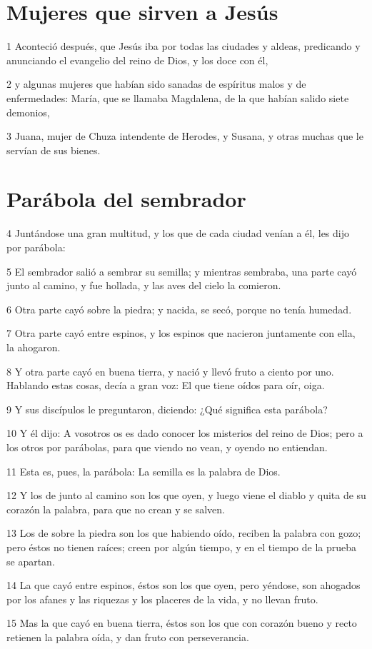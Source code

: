 \section*{Mujeres que sirven a Jesús}

\par 1 Aconteció después, que Jesús iba por todas las ciudades y aldeas, predicando y anunciando el evangelio del reino de Dios, y los doce con él,
\par 2 y algunas mujeres que habían sido sanadas de espíritus malos y de enfermedades: María, que se llamaba Magdalena, de la que habían salido siete demonios,
\par 3 Juana, mujer de Chuza intendente de Herodes, y Susana, y otras muchas que le servían de sus bienes.

\section*{Parábola del sembrador}

\par 4 Juntándose una gran multitud, y los que de cada ciudad venían a él, les dijo por parábola:
\par 5 El sembrador salió a sembrar su semilla; y mientras sembraba, una parte cayó junto al camino, y fue hollada, y las aves del cielo la comieron.
\par 6 Otra parte cayó sobre la piedra; y nacida, se secó, porque no tenía humedad.
\par 7 Otra parte cayó entre espinos, y los espinos que nacieron juntamente con ella, la ahogaron.
\par 8 Y otra parte cayó en buena tierra, y nació y llevó fruto a ciento por uno. Hablando estas cosas, decía a gran voz: El que tiene oídos para oír, oiga.
\par 9 Y sus discípulos le preguntaron, diciendo: ¿Qué significa esta parábola?
\par 10 Y él dijo: A vosotros os es dado conocer los misterios del reino de Dios; pero a los otros por parábolas, para que viendo no vean, y oyendo no entiendan.
\par 11 Esta es, pues, la parábola: La semilla es la palabra de Dios.
\par 12 Y los de junto al camino son los que oyen, y luego viene el diablo y quita de su corazón la palabra, para que no crean y se salven.
\par 13 Los de sobre la piedra son los que habiendo oído, reciben la palabra con gozo; pero éstos no tienen raíces; creen por algún tiempo, y en el tiempo de la prueba se apartan.
\par 14 La que cayó entre espinos, éstos son los que oyen, pero yéndose, son ahogados por los afanes y las riquezas y los placeres de la vida, y no llevan fruto.
\par 15 Mas la que cayó en buena tierra, éstos son los que con corazón bueno y recto retienen la palabra oída, y dan fruto con perseverancia.

